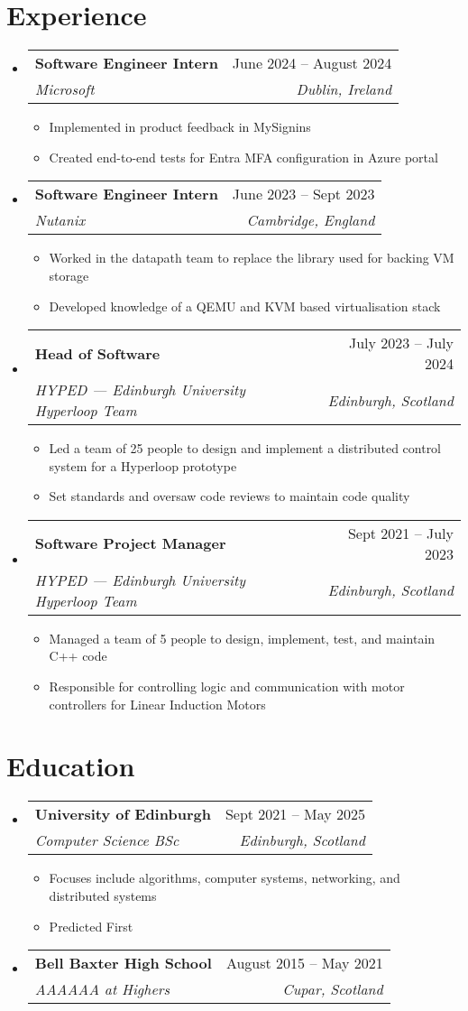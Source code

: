 \documentclass[a4paper,11pt]{article}
\makeatletter
\newcommand{\resumeItem}[1]{
  \item\small{#1}
}
\newcommand{\resumeItemListStart}{\begin{itemize}[rightmargin=0.11in]}
\newcommand{\resumeItemListEnd}{\end{itemize}}
\newcommand{\resumeQuadHeading}[4]{
  \item
  \begin{tabular*}{0.96\textwidth}[t]{l@{\extracolsep{\fill}}r}
    \textbf{#1} & #2 \\
    \textit{\small#3} & \textit{\small #4} \\
  \end{tabular*}
}
\newcommand{\resumeHeadingListStart}{
  \begin{itemize}[leftmargin=0.15in, label={}]
}
\newcommand{\resumeHeadingListEnd}{\end{itemize}}
\makeatother
\begin{document}
\section{Experience}
\resumeHeadingListStart{}
  \resumeQuadHeading{Software Engineer Intern}{June 2024 -- August 2024}
  {Microsoft}{Dublin, Ireland}
    \resumeItemListStart{}
      \resumeItem{Implemented in product feedback in MySignins}
      \resumeItem{Created end-to-end tests for Entra MFA configuration in Azure portal}
    \resumeItemListEnd{}
  \resumeQuadHeading{Software Engineer Intern}{June 2023 -- Sept 2023}
  {Nutanix}{Cambridge, England}
    \resumeItemListStart{}
      \resumeItem{Worked in the datapath team to replace the library used for backing VM storage}
      \resumeItem{Developed knowledge of a QEMU and KVM based virtualisation stack}
    \resumeItemListEnd{}
  \resumeQuadHeading{Head of Software}{July 2023 -- July 2024}
  {HYPED --- Edinburgh University Hyperloop Team}{Edinburgh, Scotland}
    \resumeItemListStart{}
      \resumeItem{Led a team of 25 people to design and implement a distributed control system for a Hyperloop prototype}
      \resumeItem{Set standards and oversaw code reviews to maintain code quality}
    \resumeItemListEnd{}  
  \resumeQuadHeading{Software Project Manager}{Sept 2021 -- July 2023}
  {HYPED --- Edinburgh University Hyperloop Team}{Edinburgh, Scotland}
    \resumeItemListStart{}
      \resumeItem{Managed a team of 5 people to design, implement, test, and maintain C++ code}
      \resumeItem{Responsible for controlling logic and communication with motor controllers for Linear Induction Motors}
    \resumeItemListEnd{}
\resumeHeadingListEnd{}



\section{Education}
  \resumeHeadingListStart{}
    \resumeQuadHeading{University of Edinburgh}{Sept 2021 -- May 2025}
    {Computer Science BSc}{Edinburgh, Scotland}
      \resumeItemListStart{}
        \resumeItem{Focuses include algorithms, computer systems, networking, and distributed systems}
        \resumeItem{Predicted First}
      \resumeItemListEnd{}
    \resumeQuadHeading{Bell Baxter High School}{August 2015 -- May 2021}
    {AAAAAA at Highers}{Cupar, Scotland}
  \resumeHeadingListEnd{}
\end{document}
